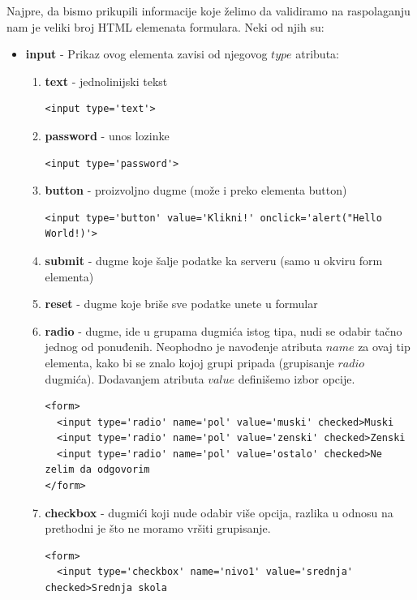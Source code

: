 Najpre, da bismo prikupili informacije koje želimo da validiramo na raspolaganju nam je veliki broj HTML elemenata formulara. Neki od njih su:
\begin{itemize}
\item \textbf{input} - Prikaz ovog elementa zavisi od njegovog $type$ atributa:
	\begin{enumerate}
		\item \textbf{text} - jednolinijski tekst
		\begin{lstlisting}[backgroundcolor = \color{lightgray}, breaklines=true]
<input type='text'>
		\end{lstlisting}
		\item \textbf{password} - unos lozinke
		\begin{lstlisting}[backgroundcolor = \color{lightgray}, breaklines=true]
<input type='password'>
		\end{lstlisting}		
		\item \textbf{button} - proizvoljno dugme (može i preko elementa button)
		\begin{lstlisting}[backgroundcolor = \color{lightgray},breaklines=true]
<input type='button' value='Klikni!' onclick='alert("Hello World!)'>
		\end{lstlisting}
		\item \textbf{submit} - dugme koje šalje podatke ka serveru (samo u okviru form elementa)
		\item \textbf{reset} - dugme koje briše sve podatke unete u formular
		\item \textbf{radio} - dugme, ide u grupama dugmića istog tipa, nudi se odabir tačno jednog od ponuđenih. Neophodno je navođenje atributa $name$ za ovaj tip elementa, kako bi se znalo kojoj grupi pripada (grupisanje $radio$ dugmića). Dodavanjem atributa $value$ definišemo izbor opcije.
		\begin{lstlisting}[backgroundcolor = \color{lightgray}, breaklines=true]
<form>
  <input type='radio' name='pol' value='muski' checked>Muski
  <input type='radio' name='pol' value='zenski' checked>Zenski
  <input type='radio' name='pol' value='ostalo' checked>Ne zelim da odgovorim
</form>
		\end{lstlisting}
		\item \textbf{checkbox} - dugmići koji nude odabir više opcija, razlika u odnosu na prethodni je što ne moramo vršiti grupisanje.
		\begin{lstlisting}[backgroundcolor = \color{lightgray}, breaklines=true]
<form>
  <input type='checkbox' name='nivo1' value='srednja' checked>Srednja skola

\end{lstlisting}
\end{enumerate}
\end{itemize}
